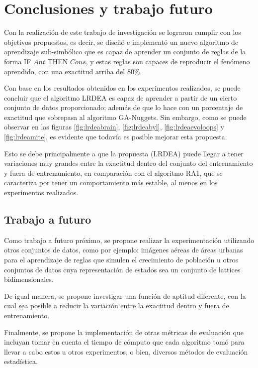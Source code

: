 \chapter{Conclusiones y trabajo futuro}

Con la realización de este trabajo de investigación se lograron cumplir con los objetivos propuestos, es decir, se diseñó e implementó un nuevo algoritmo de aprendizaje sub-simbólico que es capaz de aprender un conjunto de reglas de la forma IF $Ant$ THEN $Cons$, y estas reglas son capaces de reproducir el fenómeno aprendido, con una exactitud arriba del 80\%.

Con base en los resultados obtenidos en los experimentos realizados, se puede concluir que el algoritmo LRDEA es capaz de aprender a partir de un cierto conjunto de datos proporcionado; además de que lo hace con un porcentaje de exactitud que sobrepasa al algoritmo GA-Nuggets. Sin embargo, como se puede observar en las figuras \ref{fig:lrdeabrain}, \ref{fig:lrdeabyl}, \ref{fig:lrdeaevoloops} y \ref{fig:lrdeamite}, es evidente que todavía es posible mejorar esta propuesta.

Esto se debe principalmente a que la propuesta (LRDEA) puede llegar a tener variaciones muy grandes entre la exactitud dentro del conjunto del entrenamiento y fuera de entrenamiento, en comparación con el algoritmo RA1, que se caracteriza por tener un comportamiento más estable, al menos en los experimentos realizados.

\section{Trabajo a futuro}

Como trabajo a futuro próximo, se propone realizar la experimentación utilizando otros conjuntos de datos, como por ejemplo: imágenes aéreas de áreas urbanas para el aprendizaje de reglas que simulen el crecimiento de población u otros conjuntos de datos cuya representación de estados sea un conjunto de lattices bidimensionales.

De igual manera, se propone investigar una función de aptitud diferente, con la cual sea posible a reducir la variación entre la exactitud dentro y fuera de entrenamiento.

Finalmente, se propone la implementación de otras métricas de evaluación que incluyan tomar en cuenta el tiempo de cómputo que cada algoritmo tomó para llevar a cabo estos u otros experimentos, o bien, diversos métodos de evaluación estadística.
